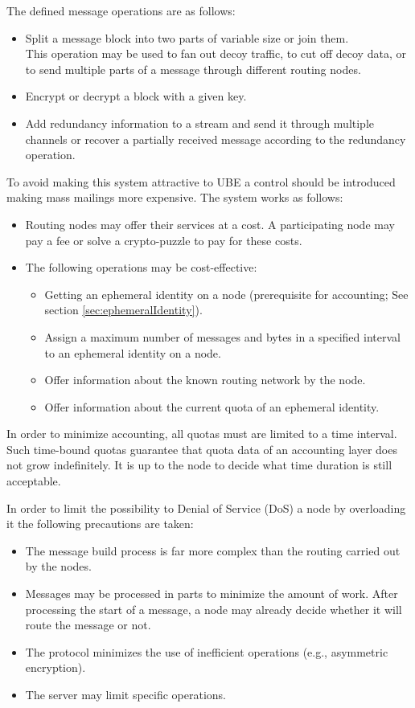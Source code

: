 The defined message operations are as follows:
\begin{itemize}
	\item Split a message block into two parts of variable size or join them.\\
	      This operation may be used to fan out decoy traffic, to cut off decoy data, or to send multiple parts of a message through different routing nodes.
	\item Encrypt or decrypt a block with a given key.      
	\item Add redundancy information to a stream and send it through multiple channels or recover a partially received message according to the redundancy operation.
\end{itemize}

To avoid making this system attractive to UBE a control should be introduced making mass mailings more expensive. The system works as follows:

\begin{itemize}
	\item Routing nodes may offer their services at a cost. A participating node may pay a fee or solve a crypto-puzzle to pay for these costs.
	\item The following operations may be cost-effective:
	\begin{itemize}
		\item Getting an ephemeral identity on a node (prerequisite for accounting; See section \ref{sec:ephemeralIdentity}).
		\item Assign a maximum number of messages and bytes in a specified interval to an ephemeral identity on a node.
		\item Offer information about the known routing network by the node.
		\item Offer information about the current quota of an ephemeral identity.
	\end{itemize}
\end{itemize}
In order to minimize accounting, all quotas must are limited to a time interval. Such time-bound quotas guarantee that quota data of an accounting layer does not grow indefinitely. It is up to the node to decide what time duration is still acceptable.

In order to limit the possibility to Denial of Service (DoS) a node by overloading it the following precautions are taken:
\begin{itemize}
	\item The message build process is far more complex than the routing carried out by the nodes.
	\item Messages may be processed in parts to minimize the amount of work. After processing the start of a message, a node may already decide whether it will route the message or not.
	\item The protocol minimizes the use of inefficient operations (e.g., asymmetric encryption).
	\item The server may limit specific operations.
\end{itemize}


